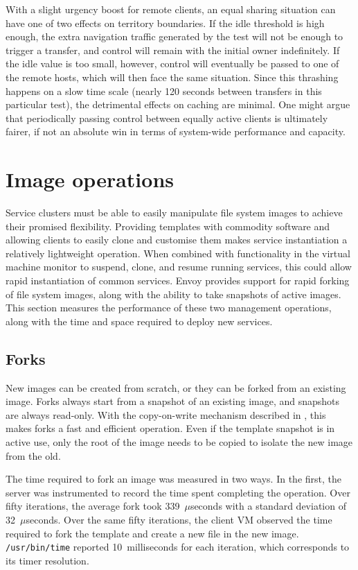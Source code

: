 With a slight urgency boost for remote clients, an equal sharing situation can have one of two effects on territory boundaries. If the idle threshold is high enough, the extra navigation traffic generated by the test will not be enough to trigger a transfer, and control will remain with the initial owner indefinitely. If the idle value is too small, however, control will eventually be passed to one of the remote hosts, which will then face the same situation. Since this thrashing happens on a slow time scale (nearly 120 seconds between transfers in this particular test), the detrimental effects on caching are minimal. One might argue that periodically passing control between equally active clients is ultimately fairer, if not an absolute win in terms of system-wide performance and capacity.

\section{Image operations}\label{sec:image-operations}

Service clusters must be able to easily manipulate file system images to achieve their promised flexibility. Providing templates with commodity software and allowing clients to easily clone and customise them makes service instantiation a relatively lightweight operation. When combined with functionality in the virtual machine monitor to suspend, clone, and resume running services, this could allow rapid instantiation of common services. Envoy provides support for rapid forking of file system images, along with the ability to take snapshots of active images. This section measures the performance of these two management operations, along with the time and space required to deploy new services.

\subsection{Forks}

New images can be created from scratch, or they can be forked from an existing image. Forks always start from a snapshot of an existing image, and snapshots are always read-only. With the copy-on-write mechanism described in , this makes forks a fast and efficient operation. Even if the template snapshot is in active use, only the root of the image needs to be copied to isolate the new image from the old.

The time required to fork an image was measured in two ways. In the first, the server was instrumented to record the time spent completing the operation. Over fifty iterations, the average fork took 339~$\mu$seconds with a standard deviation of 32~$\mu$seconds. Over the same fifty iterations, the client VM observed the time required to fork the template and create a new file in the new image. \texttt{/usr/bin/time} reported 10~milliseconds for each iteration, which corresponds to its timer resolution.

